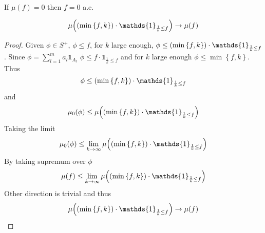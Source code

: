 \begin{lemma}
	If $\mu(f) = 0$ then $f=0$ a.e.
\end{lemma}
\begin{lemma}
	
	$$\mu\qty(\qty(\min\left\{f,k \right\}) \cdot  \mathds{1}_{\frac{1}{k}\leq f}) \to \mu(f)$$
	\begin{proof}
		Given $\phi \in S^+$, $\phi \leq f$, for $k$ large enough, $\phi \leq \qty(\min\left\{f,k \right\}) \cdot  \mathds{1}_{\frac{1}{k}\leq f}$.  Since $\phi = \sum_{l=1}^m a_l \mathds{1}_{A_l} $ $\phi \leq f\cdot  \mathds{1}_{\frac{1}{k}\leq f}$ and for $k$ large enough $\phi \leq \min\left\{f,k \right\}$. Thus 
		$$\phi \leq \qty(\min\left\{f,k \right\}) \cdot  \mathds{1}_{\frac{1}{k}\leq f}$$
		and
		$$\mu_0(\phi) \leq \mu\qty(\qty(\min\left\{f,k \right\}) \cdot  \mathds{1}_{\frac{1}{k}\leq f})$$
		Taking the limit
		$$\mu_0(\phi) \leq \lim_{k\to \infty} \mu\qty(\qty(\min\left\{f,k \right\}) \cdot  \mathds{1}_{\frac{1}{k}\leq f})$$
		By taking supremum over $\phi$
		$$\mu(f) \leq \lim_{k\to \infty} \mu\qty(\qty(\min\left\{f,k \right\}) \cdot  \mathds{1}_{\frac{1}{k}\leq f})$$
		Other direction is trivial and thus
		$$\mu\qty(\qty(\min\left\{f,k \right\}) \cdot  \mathds{1}_{\frac{1}{k}\leq f}) \to \mu(f)$$
	\end{proof}
\end{lemma}
